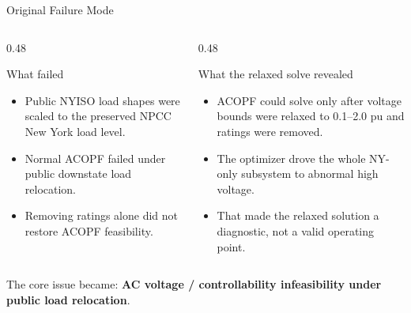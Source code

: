 \documentclass[aspectratio=169,10pt]{beamer}
\begin{document}
\begin{frame}{Original Failure Mode}
\begin{columns}[T,onlytextwidth]
\begin{column}{0.48\linewidth}
\begin{block}{What failed}
\begin{itemize}
  \item Public NYISO load shapes were scaled to the preserved NPCC New York load level.
  \item Normal ACOPF failed under public downstate load relocation.
  \item Removing ratings alone did not restore ACOPF feasibility.
\end{itemize}
\end{block}
\end{column}
\begin{column}{0.48\linewidth}
\begin{block}{What the relaxed solve revealed}
\begin{itemize}
  \item ACOPF could solve only after voltage bounds were relaxed to 0.1--2.0 pu and ratings were removed.
  \item The optimizer drove the whole NY-only subsystem to abnormal high voltage.
  \item That made the relaxed solution a diagnostic, not a valid operating point.
\end{itemize}
\end{block}
\end{column}
\end{columns}

\vspace{0.5em}
\begin{center}
\small The core issue became: \textbf{AC voltage / controllability infeasibility under public load relocation}.
\end{center}
\end{frame}
\end{document}
